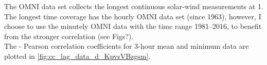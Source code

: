 The OMNI data set collects the longest continuous solar-wind measurements at \SI{1}{\au}. The longest time coverage has the hourly OMNI data set (since 1963), however, I choose to use the minutely OMNI data with the time range 1981--2016, to benefit from the stronger correlation (see Figs?).\\

The \Kp{}-\vBz{} Pearson correlation coefficients for 3-hour mean and minimum data are plotted in \autoref{fig:cc_lag_data_d_KpvsVBzgsm}.
\begin{figure}[htb]
	\begin{floatrow}
\end{floatrow}
\end{figure}
